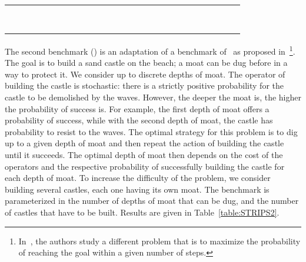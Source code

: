 \begin{table}[h!]
\begin{tabular}{|r|r|r||r|r|r|r|r|r|r||r|r|r|r|r|r|r|r|r|r|r|r|r|r|r|}
 &  &  &  &  &  &  &   &  &  &  &   &  & \rule[-3pt]{0pt}{10pt}\\
\hline  &  &  &  &  &  &  &   &  &  &  &   &  & \rule[-3pt]{0pt}{10pt}\\
 &  &  &  &  &  &  &   &  &  &  &   &  & \rule[-3pt]{0pt}{10pt}\\
 &  &  &  &  &  &  &   &  &  &  &   &  & \rule[-3pt]{0pt}{10pt}\\
 &  &  &  &  &  &  &   &  &  &  &   &  & \rule[-3pt]{0pt}{10pt}\\
\hline  &  &  &  &  &  &  &   &  &  &  &   &  & \rule[-3pt]{0pt}{10pt}\\
 &  &  &  &  &  &  &   &  &  &  &   &  & \rule[-3pt]{0pt}{10pt}\\
 &  &  &  &  &  &  &   &  &  &  &   &  & \rule[-3pt]{0pt}{10pt}\\
 &  &  &  &  &  &  &   &  &  &  &   &  & \rule[-3pt]{0pt}{10pt}\\
\hline
		\end{tabular}
		\normalsize
\end{table}

The second benchmark () is an adaptation of a benchmark of~\cite{DBLP:conf/aips/MajercikL98} as proposed in~\cite{blum2000probabilistic}\footnote{In~\cite{blum2000probabilistic}, the authors study a different problem that is to maximize the probability of reaching the goal within a given number of steps.}. The goal is to build a sand castle on the beach; a moat can be dug before in a way to protect it. We consider up to  discrete depths of moat. The operator of building the castle is stochastic: there is a strictly positive probability for the castle to be demolished by the waves. However, the deeper the moat is, the higher the probability of success is. For example, the first depth of moat offers a probability  of success, while with the second depth of moat, the castle has probability  to resist to the waves. The optimal strategy for this problem is to dig up to a given depth of moat and then repeat the action of building the castle until it succeeds. The optimal depth of moat then depends on the cost of the operators and the respective probability of successfully building the castle for each depth of moat. To increase the difficulty of the problem, we consider building several castles, each one having its own moat. The benchmark is parameterized in the number  of depths of moat that can be dug, and the number  of castles that have to be built. Results are given in Table~\ref{table:STRIPS2}.

